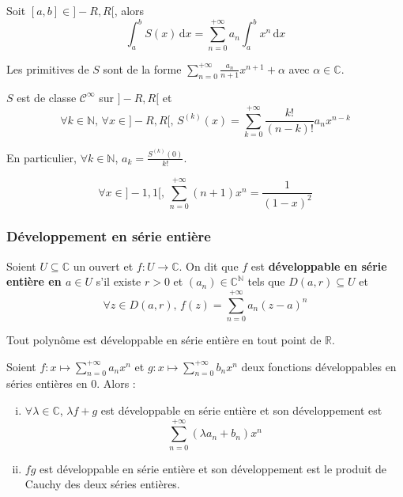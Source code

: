 	\begin{proposition}
		Soit $[a, b] \in ]-R, R[$, alors
		\[ \int_{a}^{b} S(x) \, \mathrm{d}x = \sum_{n=0}^{+\infty} a_n \int_{a}^{b} x^n \, \mathrm{d}x \]
	\end{proposition}

	\begin{corollary}
		Les primitives de $S$ sont de la forme $\sum_{n=0}^{+\infty} \frac{a_n}{n+1} x^{n+1} + \alpha$ avec $\alpha \in \mathbb{C}$.
	\end{corollary}

	\begin{proposition}
		$S$ est de classe $\mathcal{C}^\infty$ sur $]-R,R[$ et
		\[ \forall k \in \mathbb{N}, \, \forall x \in ]-R,R[, \, S^{(k)}(x) = \sum_{k = 0}^{+\infty} \frac{k!}{(n-k)!} a_n x^{n-k} \]
	\end{proposition}

	\begin{remark}
		En particulier, $\forall k \in \mathbb{N}$, $a_k = \frac{S^{(k)}(0)}{k!}$.
	\end{remark}

	\begin{example}
		\[ \forall x \in ]-1, 1[, \, \sum_{n=0}^{+\infty} (n+1)x^n = \frac{1}{(1-x)^2} \]
	\end{example}

	\subsubsection{Développement en série entière}


	\begin{definition}
		Soient $U \subseteq \mathbb{C}$ un ouvert et $f : U \rightarrow \mathbb{C}$. On dit que $f$ est \textbf{développable en série entière en $a \in U$} s'il existe $r > 0$ et $(a_n) \in \mathbb{C}^{\mathbb{N}}$ tels que $D(a, r) \subseteq U$ et
		\[ \forall z \in D(a, r), \, f(z) = \sum_{n=0}^{+\infty} a_n (z-a)^n \]
	\end{definition}


	\begin{example}
		Tout polynôme est développable en série entière en tout point de $\mathbb{R}$.
	\end{example}

	\begin{proposition}
		Soient $f : x \mapsto \sum_{n=0}^{+\infty} a_n x^n$ et $g : x \mapsto \sum_{n=0}^{+\infty} b_n x^n$ deux fonctions développables en séries entières en $0$. Alors :
		\begin{enumerate}[(i)]
			\item $\forall \lambda \in \mathbb{C}$, $\lambda f + g$ est développable en série entière et son développement est
			\[ \sum_{n=0}^{+\infty} (\lambda a_n + b_n) x^n \]
			\item $fg$ est développable en série entière et son développement est le produit de Cauchy des deux séries entières.
		\end{enumerate}
	\end{proposition}


